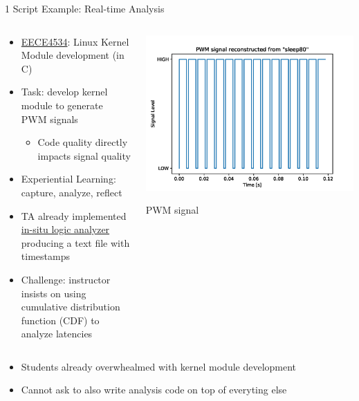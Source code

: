 \documentclass[xcolor={dvipsnames,table}, aspectratio=169]{beamer}
\begin{document}
\begin{frame}{1 Script Example: Real-time Analysis}
  \begin{columns}[T]
    \begin{column}{0.6\textwidth}
      \begin{itemize}
        \item \href{https://neu-ece-4534.github.io}{EECE4534}: Linux Kernel Module development (in C)
        \item Task: develop kernel module to generate PWM signals
        \begin{itemize}
          \item Code quality directly impacts signal quality
        \end{itemize}
        \item Experiential Learning: capture,  analyze, reflect
        \item TA already implemented \href{https://neu-ece-4534.github.io/pulsecap.html}{in-situ logic analyzer} producing a text file with timestamps
        \item Challenge: instructor insists on using cumulative distribution function (CDF) to analyze latencies  
      \end{itemize}
    \end{column}
    
    \begin{column}{0.35\textwidth}
      \includegraphics[width=\textwidth]{images/edgeutil.png}
      \tiny\centerline{PWM signal}
    \end{column}
  \end{columns}

  \begin{alertbox}
    \begin{itemize}
      \item Students already overwhealmed with kernel module development
      \item Cannot ask to also write analysis code on top of everyting else
    \end{itemize}
  \end{alertbox}
\end{frame}
\end{document}
